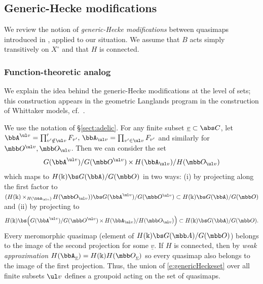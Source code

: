 \documentclass[final]{amsart}
\theoremstyle{remark}
\theoremstyle{definition}
\DeclareMathOperator*{\xt}{\times}
\numberwithin{equation}{section}
\begin{document}
\subsection{Generic-Hecke modifications} 
We review the notion of \emph{generic-Hecke modifications} between quasimaps
introduced in \cite[\S 2.2]{GN}, applied to our situation. 
We assume that $B$ acts simply transitively on $X^\circ$ and that $H$ is connected. 

\subsubsection{Function-theoretic analog} 
We explain the idea behind the generic-Hecke modifications at the level of sets; 
this construction appears in the geometric Langlands
program in the construction of Whittaker models, cf.~\cite[\S 5.3.1]{G:outline}.

We use the notation of \S\ref{sect:adelic}.
For any finite subset $\underline v \subset \abs C$, 
let $\bbA^{\ul v} = \prod'_{v'\notin \ul v} F_{v'},\, 
\bbA_{\ul v} = \prod_{v'\in \ul v} F_{v'}$ and similarly for 
$\mbb O^{\ul v}, \mbb O_{\ul v}$. Then we can consider 
the set  
\begin{equation} \label{e:genericHeckeset} 
 G(\bbA^{\ul v})/ G(\mbb O^{\ul v}) \xt H(\bbA_{\ul v})/ H(\mbb O_{\ul v})   
\end{equation}
which maps to $H(\Bbbk) \bs G(\bbA) / G(\mbb O)$ in two ways: 
(i) by projecting along the first factor to $( H(\Bbbk) \xt_{H(\bbA_{\ul v})} H(\mbb O_{\ul v})) \bs G(\bbA^{\ul v}) / G(\mbb O^{\ul v})
\subset H(\Bbbk) \bs G(\bbA) / G(\mbb O)$
and (ii) by projecting to 
\[ H(\Bbbk) \bs \Bigl( G(\bbA^{\ul v}) / G(\mbb O^{\ul v}) \xt H(\bbA_{\ul v})/H(\mbb O_{\ul v}) \Bigr) 
\subset H(\Bbbk) \bs G(\bbA)/ G(\mbb O).
\]
Every meromorphic quasimap (element of $H(\Bbbk) \bs G(\mbb A) / G(\mbb O)$) 
belongs to the image of the second projection for some 
$\underline v$. If $H$ is connected, then by \emph{weak approximation} 
$H(\bbA_{\underline v}) = H(\Bbbk) H(\mbb O_{\underline v})$ so 
every quasimap also belongs to the image of the first projection.
Thus, the union of \eqref{e:genericHeckeset} over all finite subsets $\ul v$ 
defines a groupoid acting on the set of quasimaps.
\end{document}
